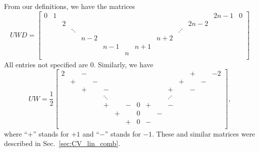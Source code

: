 From our definitions, we have the matrices
%
\begin{equation}
    UWD = \begin{bmatrix}
    0 & 1 &   &   &   &   &   &   &   &    &    &2n-1&  0 \\
      &   & 2 &   &   &   &   &   &   &    &2n-2&    &    \\
      &  & &\ddots&   &   &   &   &   &\iddots& &    &    \\
      &   &   &   &n-2&   &   &   &n+2&    &    &    &    \\
      &   &   &   &   &n-1&   &n+1&   &    &    &    &    \\
      &   &   &   &   &   & n &   &   &    &    &    &    \\
    \end{bmatrix}
\end{equation}
%
All entries not specified are $0$. Similarly, we have
%
\begin{equation}
    UW = \frac{1}{2}\begin{bmatrix}
        2 &   & - &   &   &   &   &   &   &   &   &   & + &   & -2 \\
          & + &   & - &   &   &   &   &   &   &   & + &   & - & \\ 
          &   & + &   & - &   &   &   &   &   & + &   & - &   & \\
          &   &  & &\ddots&   &   &   & & &\iddots&   &   &   & \\
          &   &   &   & + &   & - & 0 & + &   & - &   &   &   & \\
          &   &   &   &   & + &   & 0 &   & - &   &   &   &   & \\
          &   &   &   &   &   & + & 0 & - &   &   &   &   &   & \\
    \end{bmatrix},
\end{equation}
%
where ``$+$'' stands for $+1$ and ``$-$'' stands for $-1$.
These and similar matrices were described in Sec.~\ref{sec:CV_lin_comb}.


